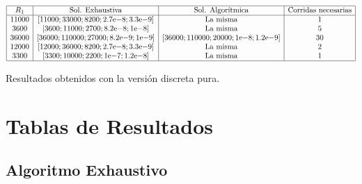 \documentclass{llncs}
\newcommand{\expnumber}[2]{{#1}\mathrm{e}{#2}}
\begin{document}
	\begin{table}[!h]
		$$
		\begin{array}{|c|c|c|c|}
		\hline
		R_1 & \text{Sol. Exhaustiva} & \text{Sol. Algorítmica} & \text{Corridas necesarias} \\
		\hline
		11000 & [11000; 33000; 8200; \expnumber{2.7}{-8}; \expnumber{3.3}{-9}] & \text{La misma} & 1 \\
		3600 & [3600; 11000; 2700; \expnumber{8.2}{-8}; \expnumber{1}{-8}] & \text{La misma} & 5 \\
		36000 & [36000; 110000; 27000; \expnumber{8.2}{-9}; \expnumber{1}{-9}] & [36000; 110000; 20000; \expnumber{1}{-8}; \expnumber{1.2}{-9}] & 30  \\
		12000 & [12000; 36000; 8200; \expnumber{2.7}{-8};\expnumber{3.3}{-9}] & \text{La misma} & 2  \\
		3300 & [3300; 10000; 2200; \expnumber{1}{-7}; \expnumber{1.2}{-8}] & \text{La misma} & 1  \\
		\hline
		\end{array}
		$$
		\caption{Resultados obtenidos con la versión discreta pura.}
		\label{cuadroSolDiscretoPuro}
	\end{table}
		

	\appendix
	\section{\textbf{Tablas de Resultados}}
		\subsection{Algoritmo Exhaustivo}
		\label{subsec:Resultados Exhaustivo}
\end{document}
